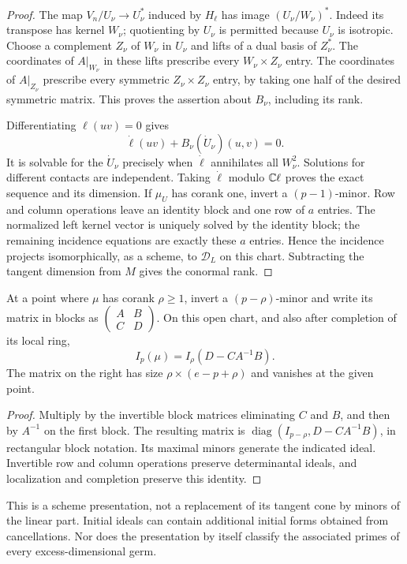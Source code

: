 \begin{proof}
The map $V_n/U_\nu\longrightarrow U_\nu^*$ induced by $H_\ell$ has
image $(U_\nu/W_\nu)^*$. Indeed its transpose has kernel $W_\nu$;
quotienting by $U_\nu$ is permitted because $U_\nu$ is isotropic.
Choose a complement $Z_\nu$ of $W_\nu$ in $U_\nu$ and lifts of a dual
basis of $Z_\nu^*$. The coordinates of $A|_{W_\nu}$ in these lifts
prescribe every $W_\nu\times Z_\nu$ entry. The coordinates of
$A|_{Z_\nu}$ prescribe every symmetric $Z_\nu\times Z_\nu$ entry,
by taking one half of the desired symmetric matrix. This proves the
assertion about $B_\nu$, including its rank.

Differentiating $\ell(uv)=0$ gives
\[
 \dot\ell(uv)+B_\nu(\dot U_\nu)(u,v)=0.
\]
It is solvable for the $\dot U_\nu$ precisely when $\dot\ell$ annihilates
all $W_\nu^2$. Solutions for different contacts are independent. Taking
$\dot\ell$ modulo $\mathbb C\ell$ proves the exact sequence and its dimension.
If $\mu_U$ has corank one, invert a $(p-1)$-minor. Row and column
operations leave an identity block and one row of $a$ entries. The
normalized left kernel vector is uniquely solved by the identity block;
the remaining incidence equations are exactly these $a$ entries. Hence
the incidence projects isomorphically, as a scheme, to $\mathscr D_L$
on this chart. Subtracting the tangent dimension from $M$ gives the
conormal rank.
\end{proof}

\begin{proposition}\label{prop:all-corank-schur}
At a point where $\mu$ has corank $\rho\ge1$, invert a
$(p-\rho)$-minor and write its matrix in blocks as
$\left(\begin{smallmatrix}A&B\\ C&D\end{smallmatrix}\right)$.
On this open chart, and also after completion of its local ring,
\begin{equation}\label{eq:all-corank-schur}
 I_p(\mu)=I_\rho(D-CA^{-1}B).
\end{equation}
The matrix on the right has size $\rho\times(e-p+\rho)$ and vanishes
at the given point.
\end{proposition}
\begin{proof}
Multiply by the invertible block matrices eliminating $C$ and $B$, and
then by $A^{-1}$ on the first block. The resulting matrix is
$\operatorname{diag}(I_{p-\rho},D-CA^{-1}B)$, in rectangular block
notation. Its maximal minors generate the indicated ideal. Invertible
row and column operations preserve determinantal ideals, and localization
and completion preserve this identity.
\end{proof}
This is a scheme presentation, not a replacement of its tangent cone by
minors of the linear part. Initial ideals can contain additional initial
forms obtained from cancellations. Nor does the presentation by itself
classify the associated primes of every excess-dimensional germ.

